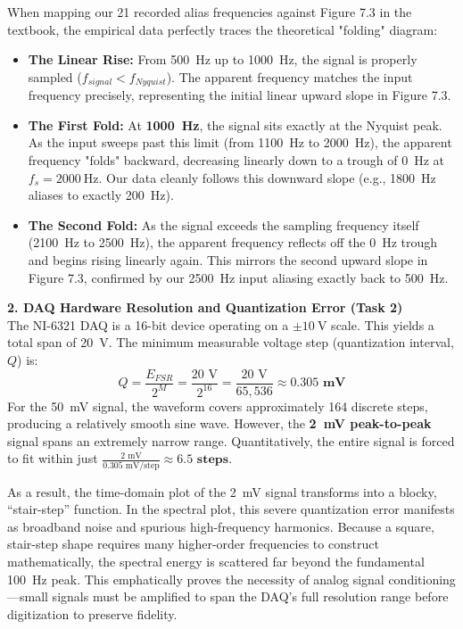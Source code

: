 \documentclass[11pt]{article}
\begin{document}
When mapping our 21 recorded alias frequencies against Figure 7.3 in the textbook, the empirical data perfectly traces the theoretical "folding" diagram:
\begin{itemize}
  \item \textbf{The Linear Rise:} From \SI{500}{\hertz} up to \SI{1000}{\hertz}, the signal is properly sampled ($f_{signal} < f_{Nyquist}$). The apparent frequency matches the input frequency precisely, representing the initial linear upward slope in Figure 7.3.
  \item \textbf{The First Fold:} At \textbf{\SI{1000}{\hertz}}, the signal sits exactly at the Nyquist peak. As the input sweeps past this limit (from \SI{1100}{\hertz} to \SI{2000}{\hertz}), the apparent frequency "folds" backward, decreasing linearly down to a trough of \SI{0}{\hertz} at $f_s = \SI{2000}{\hertz}$. Our data cleanly follows this downward slope (e.g., \SI{1800}{\hertz} aliases to exactly \SI{200}{\hertz}).
  \item \textbf{The Second Fold:} As the signal exceeds the sampling frequency itself (\SI{2100}{\hertz} to \SI{2500}{\hertz}), the apparent frequency reflects off the \SI{0}{\hertz} trough and begins rising linearly again. This mirrors the second upward slope in Figure 7.3, confirmed by our \SI{2500}{\hertz} input aliasing exactly back to \SI{500}{\hertz}.
\end{itemize}

\textbf{2. DAQ Hardware Resolution and Quantization Error (Task 2)} \\
The NI-6321 DAQ is a 16-bit device operating on a $\pm\SI{10}{\volt}$ scale. This yields a total span of \SI{20}{\volt}. The minimum measurable voltage step (quantization interval, $Q$) is:
\[ Q = \frac{E_{FSR}}{2^M} = \frac{20\text{ V}}{2^{16}} = \frac{20\text{ V}}{65,536} \approx \mathbf{0.305 \text{ mV}} \]
For the \SI{50}{\milli\volt} signal, the waveform covers approximately 164 discrete steps, producing a relatively smooth sine wave. However, the \textbf{\SI{2}{\milli\volt} peak-to-peak} signal spans an extremely narrow range. Quantitatively, the entire signal is forced to fit within just $\frac{2 \text{ mV}}{0.305 \text{ mV/step}} \approx \mathbf{6.5 \text{ steps}}$.

As a result, the time-domain plot of the \SI{2}{\milli\volt} signal transforms into a blocky, ``stair-step'' function. In the spectral plot, this severe quantization error manifests as broadband noise and spurious high-frequency harmonics. Because a square, stair-step shape requires many higher-order frequencies to construct mathematically, the spectral energy is scattered far beyond the fundamental \SI{100}{\hertz} peak. This emphatically proves the necessity of analog signal conditioning—small signals must be amplified to span the DAQ's full resolution range before digitization to preserve fidelity.
\end{document}
